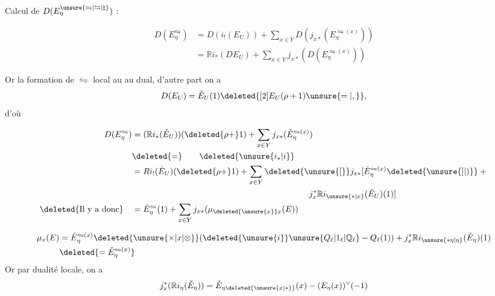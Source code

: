 Calcul de $D(E_\eta^{\unsure{\leftrightharpoons|\leftrightarrows|\natural}})$ :

\[
\begin{aligned}
D(E_\eta^{\leftrightharpoons}) &= D(i_!(E_U))+\sum_{x\in Y}D(j_{x*}(E_\eta^{\leftrightharpoons(x)}))\\
&=\mathbb R i_*(D E_U)+\sum_{x\in Y}j_{x*}(D(E_\eta^{\leftrightharpoons(x)}))
\end{aligned}
\]

Or la formation de $\leftrightharpoons$ local  au  au dual, d'autre part on a
\[
D(E_U)=\check E_U(1)\deleted{[2]E_U(\rho+1)\unsure{=|,}},
\]
d'où

\[
\begin{aligned}
D(E_\eta^{\leftrightharpoons})&=(\mathbb R i_*(\check E_U))(\deleted{\rho+}1)+\sum_{x\in Y}j_{x*}(\check E_\eta^{\leftrightharpoons(x)})\\
&\deleted{=}\qquad\deleted{\unsure{i_*|i}}\\
&=R i_!(\check E_U)(\deleted{\rho+}1)+\sum_{x\in Y}\deleted{\unsure{[}}j_{x*}[\check E_\eta^{\leftrightharpoons(x)}\deleted{\unsure{]|)}}+{}\\
&\hspace{21em}j_x^*\mathbb R i_{\unsure{*|x}}(\check E_U)(1)]\\
\text{\deleted{Il y a donc}}\quad &=\check E_\eta^{\leftrightharpoons}(1)+\sum_{x\in Y}j_{x*}(\mu_{\deleted{\unsure{x}}x}(E))
\end{aligned}
\]

\[
\begin{aligned}
\mu_x(E)&=\check E_\eta^{\leftrightharpoons(x)}\deleted{\unsure{\times|x|\otimes}}(\deleted{\unsure{i}}\unsure{Q_\ell|1_\ell|\mathbb{Q}_\ell}-Q_\ell(1))+j_x^*\mathbb R i_{\unsure{*\eta|\eta}}(\check E_\eta)(1)\\
&\deleted{=\check E_\eta^{\leftrightharpoons(x)}}
\end{aligned}
\]
Or  par dualité locale, on a
\[
j_x^*(\mathbb R i_\eta(\check E_\eta))=\check E_{\eta\deleted{\unsure{x|*}}}(x)-(E_\eta(x))^\vee(-1)
\]
